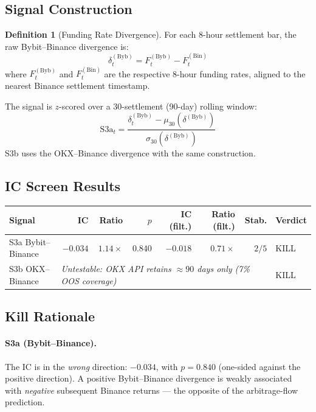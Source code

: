 \documentclass[12pt, a4paper]{article}
\theoremstyle{plain}
\theoremstyle{definition}
\newtheorem{definition}{Definition}[section]
\begin{document}
\subsection{Signal Construction}

\begin{definition}[Funding Rate Divergence]
  For each 8-hour settlement bar, the raw Bybit--Binance divergence is:
  \begin{equation}
    \delta^{(\mathrm{Byb})}_t = F^{(\mathrm{Byb})}_t - F^{(\mathrm{Bin})}_t
    \label{eq:diverg}
  \end{equation}
  where $F^{(\mathrm{Byb})}_t$ and $F^{(\mathrm{Bin})}_t$ are the
  respective 8-hour funding rates, aligned to the nearest Binance
  settlement timestamp.

  The signal is $z$-scored over a 30-settlement (90-day) rolling window:
  \begin{equation}
    \text{S3a}_t = \frac{\delta^{(\mathrm{Byb})}_t - \mu_{30}(\delta^{(\mathrm{Byb})})}
                        {\sigma_{30}(\delta^{(\mathrm{Byb})})}
    \label{eq:s3a}
  \end{equation}
  S3b uses the OKX--Binance divergence with the same construction.
\end{definition}

\subsection{IC Screen Results}

\begin{center}
\begin{tabular}{lrrrrrrl}
\toprule
Signal & IC & Ratio & $p$ & IC (filt.) & Ratio (filt.) & Stab. & Verdict \\
\midrule
S3a Bybit--Binance & $-0.034$ & $1.14\times$ & $0.840$ & $-0.018$ & $0.71\times$ & $2/5$ & KILL \\
S3b OKX--Binance   & \multicolumn{6}{l}{\emph{Untestable: OKX API retains $\approx 90$ days only (7\% OOS coverage)}} & KILL \\
\bottomrule
\end{tabular}
\end{center}

\subsection{Kill Rationale}

\paragraph{S3a (Bybit--Binance).}
The IC is in the \emph{wrong} direction: $-0.034$, with $p = 0.840$
(one-sided against the positive direction).  A positive Bybit--Binance
divergence is weakly associated with \emph{negative} subsequent Binance
returns --- the opposite of the arbitrage-flow prediction.
\end{document}
